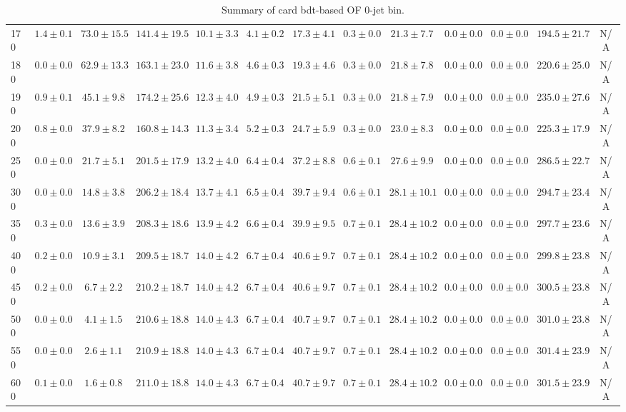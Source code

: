 \begin{table}
{\begin{center}
\begin{tabular}{l | c c | c c c c c c c c  | c c}
170 & $1.4\pm0.1$ & $73.0\pm15.5$ & $141.4\pm19.5$ & $10.1\pm3.3$ & $4.1\pm0.2$ & $17.3\pm4.1$ & $0.3\pm0.0$ & $21.3\pm7.7$ & $0.0\pm0.0$ & $0.0\pm0.0$ & $194.5\pm21.7$ & N/A \\
180 & $0.0\pm0.0$ & $62.9\pm13.3$ & $163.1\pm23.0$ & $11.6\pm3.8$ & $4.6\pm0.3$ & $19.3\pm4.6$ & $0.3\pm0.0$ & $21.8\pm7.8$ & $0.0\pm0.0$ & $0.0\pm0.0$ & $220.6\pm25.0$ & N/A \\
190 & $0.9\pm0.1$ & $45.1\pm9.8$ & $174.2\pm25.6$ & $12.3\pm4.0$ & $4.9\pm0.3$ & $21.5\pm5.1$ & $0.3\pm0.0$ & $21.8\pm7.9$ & $0.0\pm0.0$ & $0.0\pm0.0$ & $235.0\pm27.6$ & N/A \\
200 & $0.8\pm0.0$ & $37.9\pm8.2$ & $160.8\pm14.3$ & $11.3\pm3.4$ & $5.2\pm0.3$ & $24.7\pm5.9$ & $0.3\pm0.0$ & $23.0\pm8.3$ & $0.0\pm0.0$ & $0.0\pm0.0$ & $225.3\pm17.9$ & N/A \\
250 & $0.0\pm0.0$ & $21.7\pm5.1$ & $201.5\pm17.9$ & $13.2\pm4.0$ & $6.4\pm0.4$ & $37.2\pm8.8$ & $0.6\pm0.1$ & $27.6\pm9.9$ & $0.0\pm0.0$ & $0.0\pm0.0$ & $286.5\pm22.7$ & N/A \\
300 & $0.0\pm0.0$ & $14.8\pm3.8$ & $206.2\pm18.4$ & $13.7\pm4.1$ & $6.5\pm0.4$ & $39.7\pm9.4$ & $0.6\pm0.1$ & $28.1\pm10.1$ & $0.0\pm0.0$ & $0.0\pm0.0$ & $294.7\pm23.4$ & N/A \\
350 & $0.3\pm0.0$ & $13.6\pm3.9$ & $208.3\pm18.6$ & $13.9\pm4.2$ & $6.6\pm0.4$ & $39.9\pm9.5$ & $0.7\pm0.1$ & $28.4\pm10.2$ & $0.0\pm0.0$ & $0.0\pm0.0$ & $297.7\pm23.6$ & N/A \\
400 & $0.2\pm0.0$ & $10.9\pm3.1$ & $209.5\pm18.7$ & $14.0\pm4.2$ & $6.7\pm0.4$ & $40.6\pm9.7$ & $0.7\pm0.1$ & $28.4\pm10.2$ & $0.0\pm0.0$ & $0.0\pm0.0$ & $299.8\pm23.8$ & N/A \\
450 & $0.2\pm0.0$ & $6.7\pm2.2$ & $210.2\pm18.7$ & $14.0\pm4.2$ & $6.7\pm0.4$ & $40.6\pm9.7$ & $0.7\pm0.1$ & $28.4\pm10.2$ & $0.0\pm0.0$ & $0.0\pm0.0$ & $300.5\pm23.8$ & N/A \\
500 & $0.0\pm0.0$ & $4.1\pm1.5$ & $210.6\pm18.8$ & $14.0\pm4.3$ & $6.7\pm0.4$ & $40.7\pm9.7$ & $0.7\pm0.1$ & $28.4\pm10.2$ & $0.0\pm0.0$ & $0.0\pm0.0$ & $301.0\pm23.8$ & N/A \\
550 & $0.0\pm0.0$ & $2.6\pm1.1$ & $210.9\pm18.8$ & $14.0\pm4.3$ & $6.7\pm0.4$ & $40.7\pm9.7$ & $0.7\pm0.1$ & $28.4\pm10.2$ & $0.0\pm0.0$ & $0.0\pm0.0$ & $301.4\pm23.9$ & N/A \\
600 & $0.1\pm0.0$ & $1.6\pm0.8$ & $211.0\pm18.8$ & $14.0\pm4.3$ & $6.7\pm0.4$ & $40.7\pm9.7$ & $0.7\pm0.1$ & $28.4\pm10.2$ & $0.0\pm0.0$ & $0.0\pm0.0$ & $301.5\pm23.9$ & N/A \\
\hline
\end{tabular}
\end{center}
}
\caption{Summary of card bdt-based OF 0-jet bin.}
\end{table}
